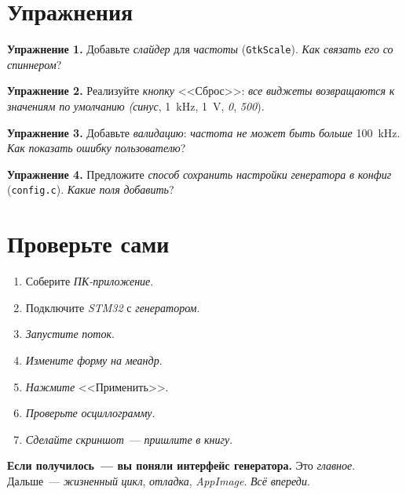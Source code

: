 \section{Упражнения}
\label{sec:gen-ui-exercises}

\begin{exercisebox}
\textbf{Упражнение 1.} Добавьте \emph{слайдер} для \emph{частоты}
(\texttt{GtkScale}). \emph{Как} \emph{связать} \emph{его} \emph{со}
\emph{спиннером}?
\end{exercisebox}

\begin{exercisebox}
\textbf{Упражнение 2.} Реализуйте \emph{кнопку} <<Сброс>>: \emph{все}
\emph{виджеты} \emph{возвращаются} \emph{к} \emph{значениям} \emph{по}
\emph{умолчанию} \emph{(синус}, \SI{1}{\kilo\hertz},
\SI{1}{\volt}, \emph{0}, \emph{500}).
\end{exercisebox}

\begin{exercisebox}
\textbf{Упражнение 3.} Добавьте \emph{валидацию}: \emph{частота}
\emph{не} \emph{может} \emph{быть} \emph{больше}
\SI{100}{\kilo\hertz}. \emph{Как} \emph{показать} \emph{ошибку}
\emph{пользователю}?
\end{exercisebox}

\begin{exercisebox}
\textbf{Упражнение 4.} Предложите \emph{способ} \emph{сохранить}
\emph{настройки} \emph{генератора} \emph{в} \emph{конфиг}
(\texttt{config.c}). \emph{Какие} \emph{поля} \emph{добавить}?
\end{exercisebox}

\section{Проверьте сами}
\label{sec:gen-ui-check}

\begin{enumerate}
    \item Соберите \emph{ПК-приложение}.
    \item Подключите \emph{STM32} с \emph{генератором}.
    \item \emph{Запустите} \emph{поток}.
    \item \emph{Измените} \emph{форму} \emph{на} \emph{меандр}.
    \item \emph{Нажмите} <<Применить>>.
    \item \emph{Проверьте} \emph{осциллограмму}.
    \item \emph{Сделайте} \emph{скриншот}~--- \emph{пришлите}
          \emph{в} \emph{книгу}.
\end{enumerate}

\begin{ideabox}
\textbf{Если получилось~--- вы поняли интерфейс генератора.}
Это \emph{главное}. Дальше~--- \emph{жизненный} \emph{цикл},
\emph{отладка}, \emph{AppImage}. \emph{Всё} \emph{впереди}.
\end{ideabox}

